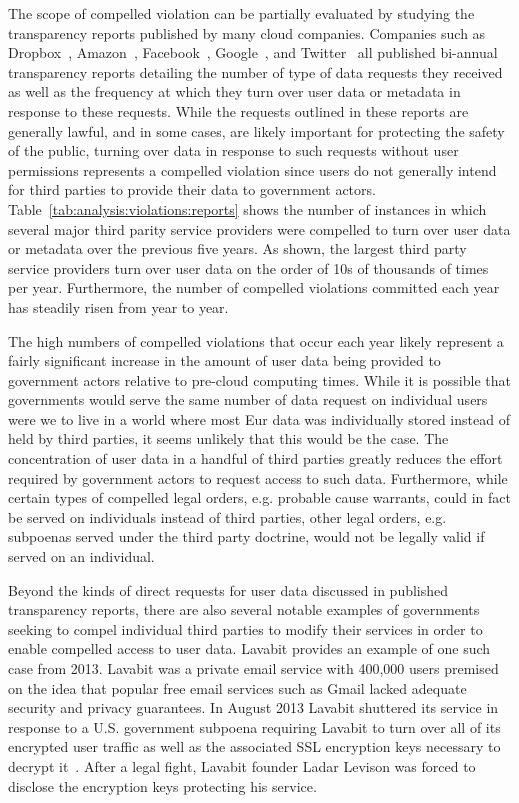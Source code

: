 The scope of compelled violation can be partially evaluated by
studying the transparency reports published by many cloud
companies. Companies such as Dropbox~\cite{dropbox-transparency},
Amazon~\cite{amazon-transparency},
Facebook~\cite{facebook-transparency},
Google~\cite{google-transparency}, and
Twitter~\cite{twitter-transparency} all published bi-annual
transparency reports detailing the number of type of data requests
they received as well as the frequency at which they turn over user
data or metadata in response to these requests. While the requests
outlined in these reports are generally lawful, and in some cases, are
likely important for protecting the safety of the public, turning over
data in response to such requests without user permissions represents
a compelled violation since users do not generally intend for third
parties to provide their data to government
actors. Table~\ref{tab:analysis:violations:reports} shows the number
of instances in which several major third parity service providers
were compelled to turn over user data or metadata over the previous
five years. As shown, the largest third party service providers turn
over user data on the order of 10s of thousands of times per
year. Furthermore, the number of compelled violations committed each
year has steadily risen from year to year.

The high numbers of compelled violations that occur each year likely
represent a fairly significant increase in the amount of user data
being provided to government actors relative to pre-cloud computing
times. While it is possible that governments would serve the same
number of data request on individual users were we to live in a world
where most Eur data was individually stored instead of held by third
parties, it seems unlikely that this would be the case. The
concentration of user data in a handful of third parties greatly
reduces the effort required by government actors to request access to
such data. Furthermore, while certain types of compelled legal orders,
e.g. probable cause warrants, could in fact be served on individuals
instead of third parties, other legal orders, e.g.  subpoenas served
under the third party doctrine, would not be legally valid if served
on an individual.

Beyond the kinds of direct requests for user data discussed in
published transparency reports, there are also several notable
examples of governments seeking to compel individual third parties to
modify their services in order to enable compelled access to user
data. Lavabit provides an example of one such case from 2013. Lavabit
was a private email service with 400,000 users premised on the idea
that popular free email services such as Gmail lacked adequate
security and privacy guarantees. In August 2013 Lavabit shuttered its
service in response to a U.S. government subpoena requiring Lavabit to
turn over all of its encrypted user traffic as well as the associated
SSL encryption keys necessary to decrypt it~\cite{lavabit,
  levsion-lavabit}. After a legal fight, Lavabit founder Ladar Levison
was forced to disclose the encryption keys protecting his service.

